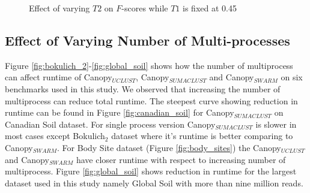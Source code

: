 \documentclass[10pt, conference, compsocconf]{IEEEtran}
\begin{document}
\begin{figure}[t]
	\begin{minipage}[t]{0.5\linewidth}
	\end{minipage}
	
	\caption{Effect of varying $T2$ on $F$-scores while $T1$ is fixed at 0.45}
	
\end{figure}


\subsection{\textbf{Effect of Varying Number of Multi-processes}}
Figure \ref{fig:bokulich_2}-\ref{fig:global_soil} shows how the number of multiprocess can affect runtime of Canopy$_{UCLUST}$, Canopy$_{SUMACLUST}$ and Canopy$_{SWARM}$ on six benchmarks used in this study. We observed that increasing the number of multiprocess can reduce total runtime. The steepest curve showing reduction in runtime can be found in Figure \ref{fig:canadian_soil} for Canopy$_{SUMACLUST}$ on Canadian Soil dataset. For single process version Canopy$_{SUMACLUST}$ is slower in most cases except Bokulich$_2$ dataset where it's runtime is better comparing to Canopy$_{SWARM}$. For Body Site dataset (Figure \ref{fig:body_sites}) the Canopy$_{UCLUST}$ and Canopy$_{SWARM}$ have closer runtime with respect to increasing number of multiprocess. Figure \ref{fig:global_soil} shows reduction in runtime for the largest dataset used in this study namely Global Soil with more than nine million reads. 
\end{document}
